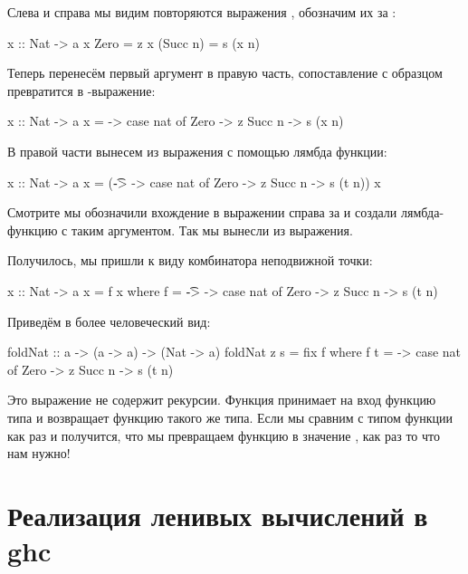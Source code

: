 Слева и справа мы видим повторяются выражения , 
обозначим их за :

\begin{code}
x :: Nat -> a
x Zero      = z
x (Succ n)  = s (x n)
\end{code}

Теперь перенесём первый аргумент в правую часть, 
сопоставление с образцом превратится в -выражение:

\begin{code}
x :: Nat -> a
x = \nat -> case nat of
                Zero    -> z
                Succ n  -> s (x n)
\end{code}

В правой части вынесем  из выражения
с помощью лямбда функции:

\begin{code}
x :: Nat -> a
x = (\t -> \nat -> case nat of
                        Zero    -> z
                        Succ n  -> s (t n)) x 
\end{code}

Смотрите мы обозначили вхождение  в выражении справа
за  и создали лямбда-функцию с таким аргументом. 
Так мы вынесли  из выражения. 

Получилось, мы пришли к виду комбинатора неподвижной точки:

\begin{code}
x :: Nat -> a
x = f x
    where f = \t -> \nat -> case nat of
                        Zero    -> z
                        Succ n  -> s (t n)
\end{code}

Приведём в более человеческий вид:

\begin{code}
foldNat :: a -> (a -> a) -> (Nat -> a)
foldNat z s = fix f
    where f t = \nat -> case nat of
                            Zero    -> z
                            Succ n  -> s (t n)
\end{code}

Это выражение не содержит рекурсии. 
Функция  принимает на вход функцию типа 
и возвращает функцию такого же типа. Если мы сравним
с типом функции  как раз и получится, что мы
превращаем функцию  в
значение , как раз то что нам нужно!

\section{Реализация ленивых вычислений в ghc}

